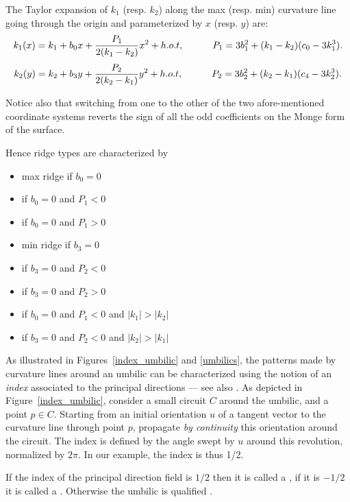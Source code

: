 \noindent The Taylor expansion of $k_1$ (resp. $k_2$) along the max
(resp. min) curvature line going through the origin and parameterized
by $x$ (resp. $y$) are:
\begin{equation}
\label{eq:taylor_along_line}
k_1(x) = k_1 + b_0x + \frac{P_1}{2(k_1-k_2)}x^2 +h.o.t , \quad \quad \quad
P_1= 3b_1^2+(k_1-k_2)(c_0-3k_1^3).
\end{equation}
%
\begin{equation}
\label{eq:taylor_along_red_line}
k_2(y) = k_2 + b_3y + \frac{P_2}{2(k_2-k_1)}y^2 +h.o.t , \quad \quad \quad
P_2= 3b_2^2+(k_2-k_1)(c_4-3k_2^3).
\end{equation}

\noindent Notice also that switching from one to the other of the two
afore-mentioned coordinate systems reverts the sign of all the odd
coefficients on the Monge form of the surface.
\medskip

Hence ridge types are characterized by 
\begin{itemize}
\item max ridge if $b_0=0$
\item {} if $b_0=0$ and $P_1<0$
\item {} if $b_0=0$ and $P_1>0$
\item min ridge if $b_3=0$
\item {} if $b_3=0$ and $P_2<0$
\item {} if $b_3=0$ and $P_2>0$
\item {} if $b_0=0$ and $P_1<0$ and $|k_1|>|k_2|$
\item {} if $b_3=0$ and $P_2<0$ and $|k_2|>|k_1|$
\end{itemize}


As illustrated in Figures~\ref{index_umbilic} and \ref{umbilics}, the
patterns made by curvature lines around an umbilic can be
characterized using the notion of an {\em index} associated to the
principal directions --- see also \cite{cgal:cp-ssulc-05}.
As depicted in Figure~\ref{index_umbilic}, consider a small circuit $C$ around the
umbilic, and a point $p \in C$. Starting from an initial orientation
$u$ of a tangent vector to the curvature line through point $p$,
propagate {\em by continuity} this orientation around the circuit.  The
index is defined by the angle swept by $u$ around this revolution,
normalized by $2\pi$. In our example, the index is thus 1/2.

If the index of the principal direction field is $1/2$
then it is called a
, if it is $-1/2$ it is called a .
 Otherwise the umbilic is qualified
.


